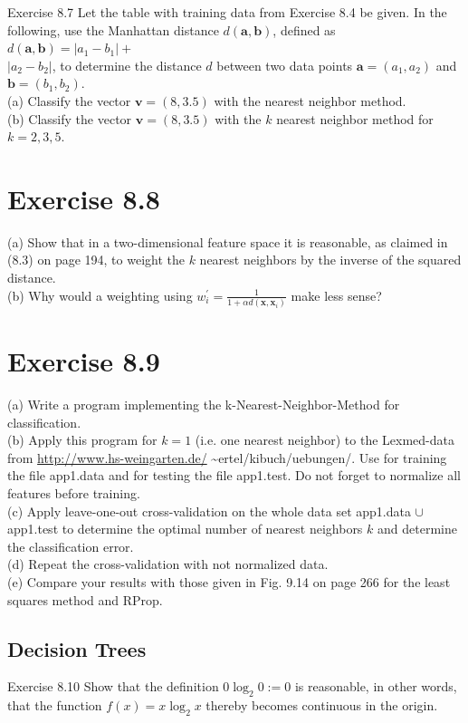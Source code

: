 \documentclass[10pt]{book}
\begin{document}
Exercise 8.7 Let the table with training data from Exercise 8.4 be given. In the following, use the Manhattan distance $d(\boldsymbol{a}, \boldsymbol{b})$, defined as $d(\boldsymbol{a}, \boldsymbol{b})=\left|a_{1}-b_{1}\right|+$\\
$\left|a_{2}-b_{2}\right|$, to determine the distance $d$ between two data points $\boldsymbol{a}=\left(a_{1}, a_{2}\right)$ and $\boldsymbol{b}=\left(b_{1}, b_{2}\right)$.\\
(a) Classify the vector $\boldsymbol{v}=(8,3.5)$ with the nearest neighbor method.\\
(b) Classify the vector $\boldsymbol{v}=(8,3.5)$ with the $k$ nearest neighbor method for $k=2,3,5$.

\section{Exercise 8.8}
(a) Show that in a two-dimensional feature space it is reasonable, as claimed in (8.3) on page 194, to weight the $k$ nearest neighbors by the inverse of the squared distance.\\
(b) Why would a weighting using $w_{i}^{\prime}=\frac{1}{1+\alpha d\left(\boldsymbol{x}, \boldsymbol{x}_{i}\right)}$ make less sense?

\section{Exercise 8.9}
(a) Write a program implementing the k-Nearest-Neighbor-Method for classification.\\
(b) Apply this program for $k=1$ (i.e. one nearest neighbor) to the Lexmed-data from \href{http://www.hs-weingarten.de/}{http://www.hs-weingarten.de/} \textasciitilde{}ertel/kibuch/uebungen/. Use for training the file app1.data and for testing the file app1.test. Do not forget to normalize all features before training.\\
(c) Apply leave-one-out cross-validation on the whole data set app1.data $\cup$ app1.test to determine the optimal number of nearest neighbors $k$ and determine the classification error.\\
(d) Repeat the cross-validation with not normalized data.\\
(e) Compare your results with those given in Fig. 9.14 on page 266 for the least squares method and RProp.

\subsection{Decision Trees}
Exercise 8.10 Show that the definition $0 \log _{2} 0:=0$ is reasonable, in other words, that the function $f(x)=x \log _{2} x$ thereby becomes continuous in the origin.
\end{document}
